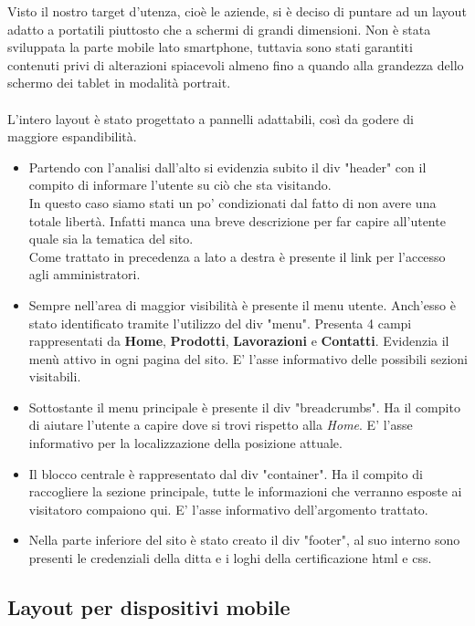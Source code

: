 \documentclass[11pt]{article}
\begin{document}
Visto il nostro target d'utenza, cioè le aziende,  si è deciso di puntare ad un layout adatto a portatili piuttosto che a schermi di grandi dimensioni. Non è stata sviluppata la parte mobile lato smartphone, tuttavia sono stati garantiti contenuti privi di alterazioni spiacevoli almeno fino a quando alla grandezza dello schermo dei tablet in modalità portrait. 
\\
\\
L'intero layout è stato progettato a pannelli adattabili, così da godere di maggiore espandibilità.
\begin{itemize}
	\item Partendo con l'analisi dall'alto si evidenzia subito il div "header" con il compito di informare l'utente su ciò che sta visitando.
	\\In questo caso siamo stati un po' condizionati dal fatto di non avere una totale libertà. Infatti manca una breve descrizione per far capire all'utente quale sia la tematica del sito.
	\\Come trattato in precedenza a lato a destra è presente il link per l'accesso agli amministratori.
	\item Sempre nell'area di maggior visibilità è presente il menu utente. Anch'esso è stato identificato tramite l'utilizzo del div "menu". Presenta 4 campi rappresentati da \textbf{Home}, \textbf{Prodotti}, \textbf{Lavorazioni} e \textbf{Contatti}. Evidenzia il menù attivo in ogni pagina del sito. E' l'asse informativo delle possibili sezioni visitabili.
	\item Sottostante il menu principale è presente il div "breadcrumbs". Ha il compito di aiutare l'utente a capire dove si trovi rispetto alla \textit{Home}. E' l'asse informativo per la localizzazione della posizione attuale.
	\item Il blocco centrale è rappresentato dal div "container". Ha il compito di raccogliere la sezione principale, tutte le informazioni che verranno esposte ai visitatoro compaiono qui. E' l'asse informativo dell'argomento trattato.
	\item Nella parte inferiore del sito è stato creato il div "footer", al suo interno sono presenti le credenziali della ditta e i loghi della certificazione html e css.
\end{itemize}

\subsection{Layout per dispositivi mobile}
\end{document}
